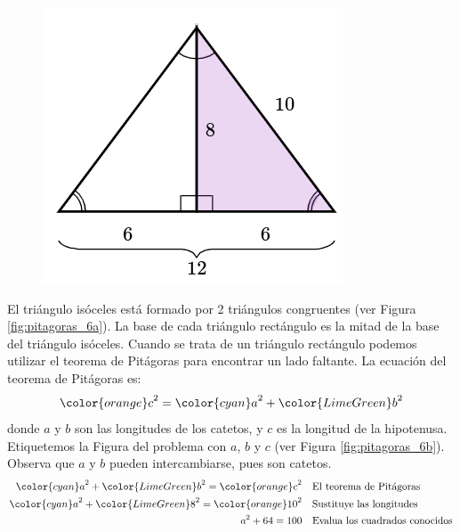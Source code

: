 \begin{solutionbox}{15cm}
\begin{minipage}{0.2\textwidth}
\begin{figure}[H]
            \includegraphics[width=0.9\linewidth]{../images/pitagoras6c.png}
            \caption{}
            \label{fig:pitagoras_6c}
        \end{figure}
    \end{minipage}\hfill
    \begin{minipage}{0.75\textwidth}
        El triángulo isóceles está formado por 2 triángulos congruentes (ver Figura \ref{fig:pitagoras_6a}).
        La base de cada triángulo rectángulo es la mitad de la base del triángulo isóceles.
        Cuando se trata de un triángulo rectángulo podemos utilizar el teorema de Pitágoras para encontrar un lado faltante.
        La ecuación del teorema de Pitágoras es:
        \[{\color{orange}c}^2={\color{cyan}a}^2+{\color{LimeGreen}b}^2\]
        donde $a$ y $b$ son las longitudes de los catetos, y $c$ es la longitud de la hipotenusa.
        Etiquetemos la Figura del problema con $a$, $b$ y $c$ (ver Figura \ref{fig:pitagoras_6b}).
        Observa que $a$ y $b$ pueden intercambiarse, pues son catetos.
        \begin{align*}
            {\color{cyan}a}^2+{\color{LimeGreen}b}^2  ={\color{orange}c}^2  & \text{\quad El teorema de Pitágoras}                          \\
            {\color{cyan}a}^2+{\color{LimeGreen}8}^2  ={\color{orange}10}^2 & \text{\quad Sustituye las longitudes}                         \\
            a^2+64   =100                                                   & \text{\quad Evalua los cuadrados conocidos}                   \\

\end{align*}
\end{minipage}
\end{solutionbox}
